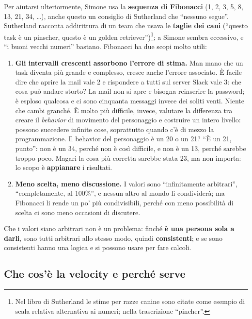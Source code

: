 Per aiutarsi ulteriormente, Simone usa la \textbf{sequenza di Fibonacci} (1,
2, 3, 5, 8, 13, 21, 34, \dots), anche questo un consiglio di Sutherland che
``nessuno segue''. Sutherland racconta addirittura di un team che usava le
\textbf{taglie dei cani} (``questo task è un pinscher, questo è un golden
retriever'')\footnote{Nel libro di Sutherland le stime per razze canine sono
citate come esempio di scala relativa alternativa ai numeri; nella
trascrizione ``pincher''.}; a Simone sembra eccessivo, e ``i buoni vecchi
numeri'' bastano. Fibonacci ha due scopi molto utili:
\begin{enumerate}
  \item \textbf{Gli intervalli crescenti assorbono l'errore di stima.} Man
        mano che un task diventa più grande e complesso, cresce anche
        l'errore associato. È facile dire che aprire la mail vale 2 e
        rispondere a tutti sul server Slack vale 3: che cosa può andare
        storto? La mail non si apre e bisogna reinserire la password; è
        esploso qualcosa e ci sono cinquanta messaggi invece dei soliti
        venti. Niente che cambi granché. È molto più difficile, invece,
        valutare la differenza tra creare il \emph{behavior} di movimento del
        personaggio e costruire un intero livello: possono succedere
        infinite cose, soprattutto quando c'è di mezzo la programmazione.
        Il behavior del personaggio è un 20 o un 21? ``È un 21, punto'':
        non è un 34, perché non è così difficile, e non è un 13, perché
        sarebbe troppo poco. Magari la cosa più corretta sarebbe stata 23,
        ma non importa: lo scopo è \textbf{appianare} i risultati.
  \item \textbf{Meno scelta, meno discussione.} I valori sono
        ``infinitamente arbitrari'', ``completamente, al 100\%'', e nessun
        altro al mondo li condividerà; ma Fibonacci li rende un po' più
        condivisibili, perché con meno possibilità di scelta ci sono meno
        occasioni di discutere.
\end{enumerate}
Che i valori siano arbitrari non è un problema: finché \textbf{è una persona
sola a darli}, sono tutti arbitrari allo stesso modo, quindi
\textbf{consistenti}; e se sono consistenti hanno una logica e si possono
usare per fare calcoli.

\subsection{Che cos'è la velocity e perché serve}

